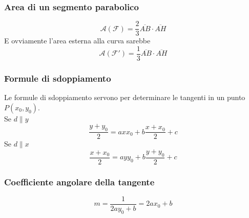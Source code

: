 \subsubsection{Area di un segmento parabolico}
\begin{center}
\end{center}
\begin{equation*}
\mathscr{A}(\mathscr{F}) = \frac{2}{3}\overline{AB}\cdot\overline{AH}
\end{equation*}
E ovviamente l'area esterna alla curva sarebbe
\begin{equation*}
\mathscr{A}(\mathscr{F}') = \frac{1}{3}\overline{AB}\cdot\overline{AH}
\end{equation*}

\subsubsection{Formule di sdoppiamento}
Le formule di sdoppiamento servono per determinare le tangenti in un punto $P(x_0,y_0)$.\\
Se $d\|y$
\begin{equation*}
\frac{y+y_0}{2}=axx_0+b\frac{x+x_0}{2}+c
\end{equation*}
Se $d\|x$
\begin{equation*}
\frac{x+x_0}{2}=ayy_0+b\frac{y+y_0}{2}+c
\end{equation*}

\subsubsection{Coefficiente angolare della tangente}
\begin{equation*}
m = \frac{1}{2ay_0+b} = 2ax_0+b
\end{equation*}

